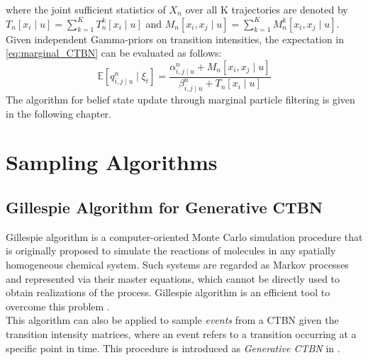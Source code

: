 where the joint sufficient statistics of $ X_n $ over all K trajectories are denoted by  $ T_{n}[x_i\mid u] = \sum_{k=1}^{K} T_{n}^k[x_i\mid u] $ and $ M_{n}[x_i, x_j\mid u] =\sum_{k=1}^{K} M_{n}^k[x_i, x_j\mid u]$.\\
Given independent Gamma-priors on transition intensities, the expectation in \autoref{eq:marginal_CTBN} can be evaluated as follows:
\begin{equation}
\mathbb{E}\left[q_{i,j\mid u}^{n} \mid \xi_{t}\right]=\frac{\alpha^n_{i,j\mid u}+M_{n}[x_i, x_j\mid u]}{\beta^n_{i,j\mid u}+T_{n}[x_i \mid u]}
\label{eq:estimated_Q}
\end{equation}
The algorithm for belief state update through marginal particle filtering is given in the following chapter. 

\section{Sampling Algorithms}
\label{sec:sampling_alg}
\subsection{Gillespie Algorithm for Generative CTBN}
Gillespie algorithm is a computer-oriented Monte Carlo simulation procedure that is originally proposed to simulate the reactions of molecules in any spatially homogeneous chemical system. Such systems are regarded as Markov processes and represented via their master equations, which cannot be directly used to obtain realizations of the process. Gillespie algorithm is an efficient tool to overcome this problem \cite{Gillespie1976}.\\
This algorithm can also be applied to sample \textit{events} from a CTBN given the transition intensity matrices, where an event refers to a transition occurring at a specific point in time. This procedure is introduced as \textit{Generative CTBN} in \cite{Nodelman1995}.


